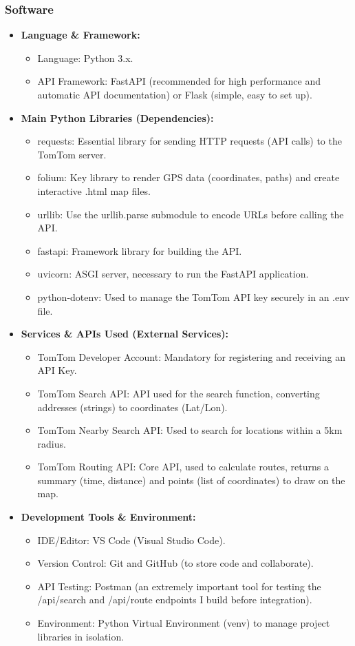 \subsubsection{Software}
\begin{itemize}
    \item \textbf{Language \& Framework:}
    \begin{itemize}
        \item Language: Python 3.x.
        \item API Framework: FastAPI (recommended for high performance and automatic API documentation) or Flask (simple, easy to set up).
    \end{itemize}
    \item \textbf{Main Python Libraries (Dependencies):}
    \begin{itemize}
        \item requests: Essential library for sending HTTP requests (API calls) to the TomTom server.
        \item folium: Key library to render GPS data (coordinates, paths) and create interactive .html map files.
        \item urllib: Use the urllib.parse submodule to encode URLs before calling the API.
        \item fastapi: Framework library for building the API.
        \item uvicorn: ASGI server, necessary to run the FastAPI application.
        \item python-dotenv: Used to manage the TomTom API key securely in an .env file.
    \end{itemize}
    \item \textbf{Services \& APIs Used (External Services):}
    \begin{itemize}
        \item TomTom Developer Account: Mandatory for registering and receiving an API Key.
        \item TomTom Search API: API used for the search function, converting addresses (strings) to coordinates (Lat/Lon).
        \item TomTom Nearby Search API: Used to search for locations within a 5km radius.
        \item TomTom Routing API: Core API, used to calculate routes, returns a summary (time, distance) and points (list of coordinates) to draw on the map.
    \end{itemize}
    \item \textbf{Development Tools \& Environment:}
    \begin{itemize}
        \item IDE/Editor: VS Code (Visual Studio Code).
        \item Version Control: Git and GitHub (to store code and collaborate).
        \item API Testing: Postman (an extremely important tool for testing the /api/search and /api/route endpoints I build before integration).
        \item Environment: Python Virtual Environment (venv) to manage project libraries in isolation.
    \end{itemize}
\end{itemize}



